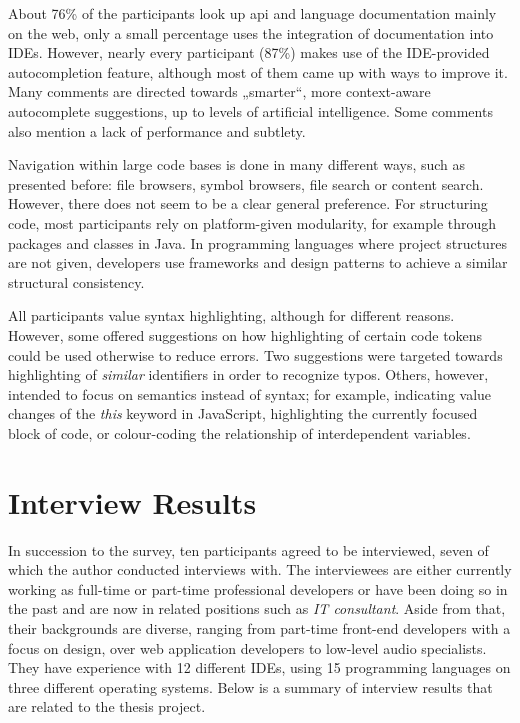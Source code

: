 About 76\% of the participants look up \ac{api} and language
documentation mainly on the web, only a small percentage uses the
integration of documentation into IDEs. However, nearly every
participant (87\%) makes use of the IDE-provided autocompletion feature,
although most of them came up with ways to improve it. Many comments are
directed towards „smarter“, more context-aware autocomplete suggestions,
up to levels of artificial intelligence. Some comments also mention a
lack of performance and subtlety.

Navigation within large code bases is done in many different ways, such
as presented before: file browsers, symbol browsers, file search or
content search. However, there does not seem to be a clear general
preference. For structuring code, most participants rely on
platform-given modularity, for example through packages and classes in
Java. In programming languages where project structures are not given,
developers use frameworks and design patterns to achieve a similar
structural consistency.

All participants value syntax highlighting, although for different
reasons. However, some offered suggestions on how highlighting of
certain code tokens could be used otherwise to reduce errors. Two
suggestions were targeted towards highlighting of \emph{similar}
identifiers in order to recognize typos. Others, however, intended to
focus on semantics instead of syntax; for example, indicating value
changes of the \emph{this} keyword in JavaScript, highlighting the
currently focused block of code, or colour-coding the relationship of
interdependent variables.

\section{Interview Results}\label{interview-results}

In succession to the survey, ten participants agreed to be interviewed,
seven of which the author conducted interviews with. The interviewees
are either currently working as full-time or part-time professional
developers or have been doing so in the past and are now in related
positions such as \emph{IT consultant}. Aside from that, their
backgrounds are diverse, ranging from part-time front-end developers
with a focus on design, over web application developers to low-level
audio specialists. They have experience with 12 different IDEs, using 15
programming languages on three different operating systems. Below is a
summary of interview results that are related to the thesis project.

